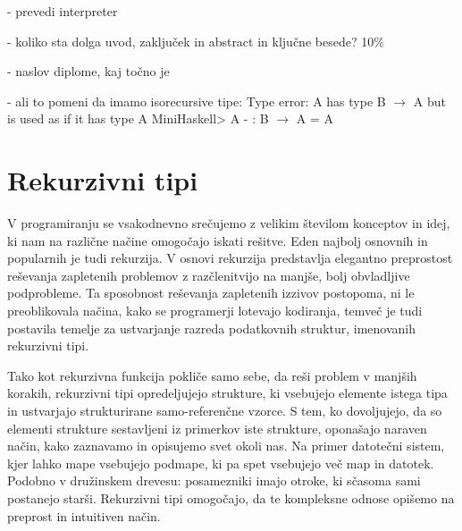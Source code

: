 \documentclass[12pt,a4paper,openany]{book}
\begin{document}
- prevedi interpreter

- koliko sta dolga uvod, zaključek in abstract in ključne besede? 10\%

- naslov diplome, kaj točno je

- ali to pomeni da imamo isorecursive tipe: Type error: A has type B $\rightarrow$ A but is used as if it has type A
MiniHaskell> A      
- : B $\rightarrow$ A = A



\newpage
\chapter{Rekurzivni tipi} %
V programiranju se vsakodnevno srečujemo z velikim številom konceptov in idej, ki nam na različne načine omogočajo iskati rešitve. Eden najbolj osnovnih in popularnih je tudi rekurzija.
V osnovi rekurzija predstavlja elegantno preprostost reševanja zapletenih problemov z razčlenitvijo na manjše, bolj obvladljive podprobleme. Ta sposobnost reševanja zapletenih izzivov 
postopoma, ni le preoblikovala načina, kako se programerji lotevajo kodiranja, temveč je tudi postavila temelje za ustvarjanje razreda podatkovnih struktur, imenovanih rekurzivni tipi.

Tako kot rekurzivna funkcija pokliče samo sebe, da reši problem v manjših korakih, rekurzivni tipi opredeljujejo strukture, ki vsebujejo elemente istega tipa in ustvarjajo strukturirane 
samo-referenčne vzorce. S tem, ko dovoljujejo, da so elementi strukture sestavljeni iz primerkov iste strukture, oponašajo naraven način, kako zaznavamo in opisujemo svet okoli nas. 
Na primer datotečni sistem, kjer lahko mape vsebujejo podmape, ki pa spet vsebujejo več map in datotek. Podobno v družinskem drevesu: posamezniki imajo otroke, ki sčasoma sami 
postanejo starši. Rekurzivni tipi omogočajo, da te kompleksne odnose opišemo na preprost in intuitiven način.
\end{document}
